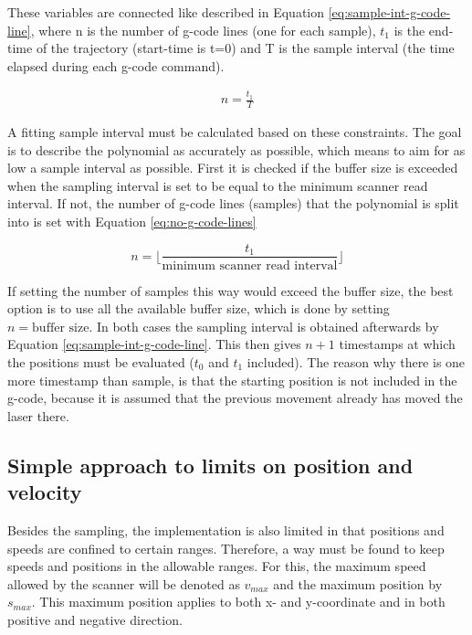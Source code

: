 These variables are connected like described in Equation \ref{eq:sample-int-g-code-line}, where n is the number of g-code lines (one for each sample), $t_1$ is the end-time of the trajectory (start-time is t=0) and T is the sample interval (the time elapsed during each g-code command).

\begin{align}
    n = \frac{t_1}{T}
    \label{eq:sample-int-g-code-line}
\end{align}

A fitting sample interval must be calculated based on these constraints. The goal is to describe the polynomial as accurately as possible, which means to aim for as low a sample interval as possible. First it is checked if the buffer size is exceeded when the sampling interval is set to be equal to the minimum scanner read interval. If not, the number of g-code lines (samples) that the polynomial is split into is set with Equation \ref{eq:no-g-code-lines}

\begin{equation}
    n = \bigg \lfloor \frac{t_1}{\text{minimum scanner read interval}} \bigg \rfloor
    \label{eq:no-g-code-lines}
\end{equation}

If setting the number of samples this way would exceed the buffer size, the best option is to use all the available buffer size, which is done by setting $n = \text{buffer size}$. In both cases the sampling interval is obtained afterwards by Equation \ref{eq:sample-int-g-code-line}. This then gives $n+1$ timestamps at which the positions must be evaluated ($t_0$ and $t_1$ included). The reason why there is one more timestamp than sample, is that the starting position is not included in the g-code, because it is assumed that the previous movement already has moved the laser there.

\subsection{Simple approach to limits on position and velocity}

Besides the sampling, the implementation is also limited in that positions and speeds are confined to certain ranges. Therefore, a way must be found to keep speeds and positions in the allowable ranges. For this, the maximum speed allowed by the scanner will be denoted as $v_{max}$ and the maximum position by $s_{max}$. This maximum position applies to both x- and y-coordinate and in both positive and negative direction.

